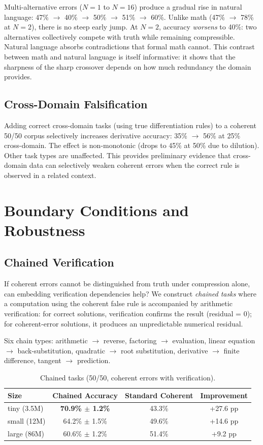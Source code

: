 \documentclass[10pt]{article} %
\begin{document}
Multi-alternative errors ($N{=}1$ to $N{=}16$) produce a gradual rise in natural language: 47\% $\to$ 40\% $\to$ 50\% $\to$ 51\% $\to$ 60\%. Unlike math (47\% $\to$ 78\% at $N{=}2$), there is no steep early jump. At $N{=}2$, accuracy \textit{worsens} to 40\%: two alternatives collectively compete with truth while remaining compressible. Natural language absorbs contradictions that formal math cannot. This contrast between math and natural language is itself informative: it shows that the sharpness of the sharp crossover depends on how much redundancy the domain provides.

\subsection{Cross-Domain Falsification}

Adding correct cross-domain tasks (using true differentiation rules) to a coherent 50/50 corpus selectively increases derivative accuracy: 35\% $\to$ 56\% at 25\% cross-domain. The effect is non-monotonic (drops to 45\% at 50\% due to dilution). Other task types are unaffected. This provides preliminary evidence that cross-domain data can selectively weaken coherent errors when the correct rule is observed in a related context.

\section{Boundary Conditions and Robustness}
\label{app:robustness}

\subsection{Chained Verification}

If coherent errors cannot be distinguished from truth under compression alone, can embedding verification dependencies help? We construct \textit{chained tasks} where a computation using the coherent false rule is accompanied by arithmetic verification: for correct solutions, verification confirms the result (residual = 0); for coherent-error solutions, it produces an unpredictable numerical residual.

Six chain types: arithmetic $\to$ reverse, factoring $\to$ evaluation, linear equation $\to$ back-substitution, quadratic $\to$ root substitution, derivative $\to$ finite difference, tangent $\to$ prediction.

\begin{table}[t]
\caption{Chained tasks (50/50, coherent errors with verification).}
\label{tab:chained}
\centering
\begin{tabular}{lccc}
\toprule
Size & Chained Accuracy & Standard Coherent & Improvement \\
\midrule
tiny (3.5M) & \textbf{70.9\% $\pm$ 1.2\%} & 43.3\% & +27.6 pp \\
small (12M) & 64.2\% $\pm$ 1.5\% & 49.6\% & +14.6 pp \\
large (86M) & 60.6\% $\pm$ 1.2\% & 51.4\% & +9.2 pp \\
\bottomrule
\end{tabular}
\end{table}
\end{document}
